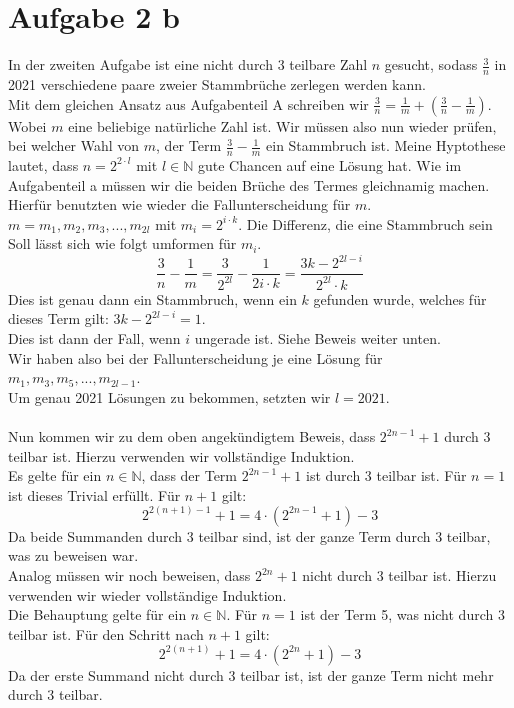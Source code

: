 \documentclass{article}
\begin{document}
\section*{Aufgabe 2 b}
In der zweiten Aufgabe ist eine nicht durch 3 teilbare Zahl \(n\) gesucht, 
sodass \(\frac{3}{n}\) in 2021 verschiedene paare zweier Stammbrüche zerlegen werden kann.\\
Mit dem gleichen Ansatz aus Aufgabenteil A schreiben wir \(\frac{3}{n} = \frac{1}{m} + (\frac{3}{n} - \frac{1}{m})\). 
Wobei \(m\) eine beliebige natürliche Zahl ist. Wir müssen also nun wieder prüfen, bei welcher Wahl von \(m\), 
der Term \(\frac{3}{n} - \frac{1}{m}\) ein Stammbruch ist. Meine Hyptothese lautet, dass \(n = 2^{2 \cdot l}\) mit \(l \in \mathbb{N}\) 
gute Chancen auf eine Lösung hat. Wie im Aufgabenteil a müssen wir die beiden Brüche des Termes gleichnamig machen.\\
Hierfür benutzten wie wieder die Fallunterscheidung für $m$.\\
\(m = m_1, m_2, m_3, ..., m_{2l}\) mit \(m_i = 2^{i \cdot k}\). 
Die Differenz, die eine Stammbruch sein Soll lässt sich wie folgt umformen für $m_i$. 
\begin{equation}
    \frac{3}{n} - \frac{1}{m} = \frac{3}{2^{2l}} - \frac{1}{2i \cdot k} = \frac{3k - 2^{2l - i}}{2^{2l} \cdot k}
\end{equation}
Dies ist genau dann ein Stammbruch, wenn ein $k$ gefunden wurde, welches für dieses Term gilt: $3k - 2^{2l - i} = 1$.\\
Dies ist dann der Fall, wenn $i$ ungerade ist. Siehe Beweis weiter unten.\\
Wir haben also bei der Fallunterscheidung je eine Lösung für \(m_1, m_3, m_5, ..., m_{2l - 1}\).\\
Um genau 2021 Lösungen zu bekommen, setzten wir  $l = 2021$.\\\\
Nun kommen wir zu dem oben angekündigtem Beweis, dass \(2^{2n - 1} + 1\) durch 3 teilbar ist. Hierzu verwenden wir vollständige Induktion.\\
Es gelte für ein \(n \in \mathbb{N}\), dass der Term \(2^{2n - 1} + 1\) ist durch 3 teilbar ist. Für $n = 1$ ist dieses Trivial erfüllt. Für $n + 1$ gilt: 
\begin{equation}
    2^{2(n + 1) - 1} + 1 = 4 \cdot (2^{2n - 1} + 1) - 3
\end{equation}
Da beide Summanden durch 3 teilbar sind, ist der ganze Term durch 3 teilbar, was zu beweisen war.\\
Analog müssen wir noch beweisen, dass \(2^{2n} + 1\) nicht durch 3 teilbar ist. Hierzu verwenden wir wieder vollständige Induktion.\\
Die Behauptung gelte für ein \(n \in \mathbb{N}\). Für $n = 1$ ist der Term 5, was nicht durch 3 teilbar ist. Für den Schritt nach $n + 1$ gilt: 
\begin{equation}
    2^{2(n + 1)} + 1 = 4 \cdot (2^{2n} + 1) - 3
\end{equation}
Da der erste Summand nicht durch 3 teilbar ist, ist der ganze Term nicht mehr durch 3 teilbar.
\end{document}
